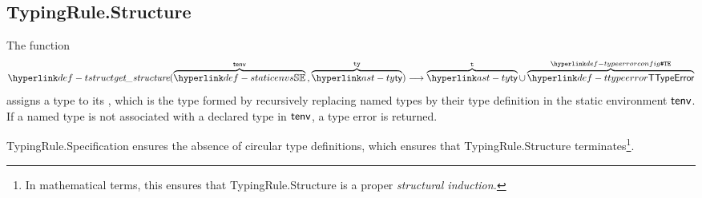 \subsection{TypingRule.Structure\label{sec:TypingRule.structure}}
\hypertarget{def-structure}{}
The function
\[
  \tstruct(\overname{\staticenvs}{\tenv} \aslsep \overname{\ty}{\tty}) \aslto \overname{\ty}{\vt} \cup \overname{\TTypeError}{\TypeErrorConfig}
\]
assigns a type to its \hypertarget{def-tstruct}{\emph{\structure}}, which is the type formed by
recursively replacing named types by their type definition in the static environment $\textsf{tenv}$.
If a named type is not associated with a declared type in $\textsf{tenv}$, a type error is returned.

TypingRule.Specification ensures the absence of circular type definitions,
which ensures that TypingRule.Structure terminates\footnote{In mathematical terms,
this ensures that TypingRule.Structure is a proper \emph{structural induction.}}.

